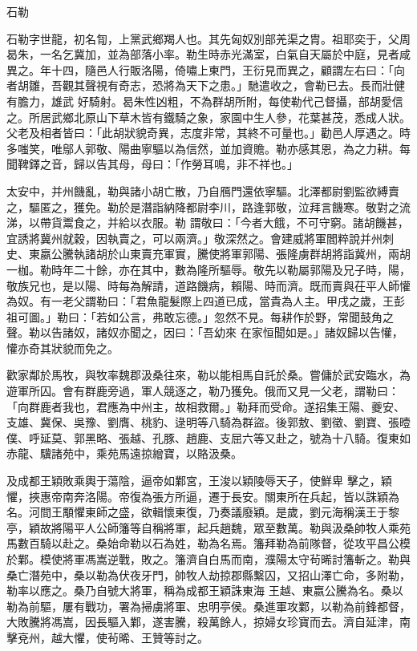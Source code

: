 
\begin{pinyinscope}
石勒



 石勒字世龍，初名㔨，上黨武鄉羯人也。其先匈奴別部羌渠之胄。祖耶奕于，父周曷朱，一名乞冀加，並為部落小率。勒生時赤光滿室，白氣自天屬於中庭，見者咸異之。年十四，隨邑人行販洛陽，倚嘯上東門，王衍見而異之，顧謂左右曰：「向者胡雛，吾觀其聲視有奇志，恐將為天下之患。」馳遣收之，會勒已去。長而壯健有膽力，雄武
 好騎射。曷朱性凶粗，不為群胡所附，每使勒代己督攝，部胡愛信之。所居武鄉北原山下草木皆有鐵騎之象，家園中生人參，花葉甚茂，悉成人狀。父老及相者皆曰：「此胡狀貌奇異，志度非常，其終不可量也。」勸邑人厚遇之。時多嗤笑，唯鄔人郭敬、陽曲寧驅以為信然，並加資贍。勒亦感其恩，為之力耕。每聞鞞鐸之音，歸以告其母，母曰：「作勞耳鳴，非不祥也。」



 太安中，并州饑亂，勒與諸小胡亡散，乃自鴈門還依寧驅。北澤都尉劉監欲縛賣之，驅匿之，獲免。勒於是潛詣納降都尉李川，路逢郭敬，泣拜言饑寒。敬對之流涕，以帶貨鬻食之，并給以衣服。勒
 謂敬曰：「今者大餓，不可守窮。諸胡饑甚，宜誘將冀州就穀，因執賣之，可以兩濟。」敬深然之。會建威將軍閻粹說并州刺史、東嬴公騰執諸胡於山東賣充軍實，騰使將軍郭陽、張隆虜群胡將詣冀州，兩胡一枷。勒時年二十餘，亦在其中，數為隆所驅辱。敬先以勒屬郭陽及兄子時，陽，敬族兄也，是以陽、時每為解請，道路饑病，賴陽、時而濟。既而賣與茌平人師懽為奴。有一老父謂勒曰：「君魚龍髮際上四道已成，當貴為人主。甲戌之歲，王彭祖可圖。」勒曰：「若如公言，弗敢忘德。」忽然不見。每耕作於野，常聞鼓角之聲。勒以告諸奴，諸奴亦聞之，因曰：「吾幼來
 在家恒聞如是。」諸奴歸以告懽，懽亦奇其狀貌而免之。



 歡家鄰於馬牧，與牧率魏郡汲桑往來，勒以能相馬自託於桑。嘗傭於武安臨水，為遊軍所囚。會有群鹿旁過，軍人競逐之，勒乃獲免。俄而又見一父老，謂勒曰：「向群鹿者我也，君應為中州主，故相救爾。」勒拜而受命。遂招集王陽、夔安、支雄、冀保、吳豫、劉膺、桃豹、逯明等八騎為群盜。後郭敖、劉徵、劉寶、張曀僕、呼延莫、郭黑略、張越、孔豚、趙鹿、支屈六等又赴之，號為十八騎。復東如赤龍、驥諸苑中，乘苑馬遠掠繒寶，以賂汲桑。



 及成都王穎敗乘輿于蕩陰，逼帝如鄴宮，王浚以穎陵辱天子，使鮮卑
 擊之，穎懼，挾惠帝南奔洛陽。帝復為張方所逼，遷于長安。關東所在兵起，皆以誅穎為名。河間王顒懼東師之盛，欲輯懷東復，乃奏議廢穎。是歲，劉元海稱漢王于黎亭，穎故將陽平人公師籓等自稱將軍，起兵趙魏，眾至數萬。勒與汲桑帥牧人乘苑馬數百騎以赴之。桑始命勒以石為姓，勒為名焉。籓拜勒為前隊督，從攻平昌公模於鄴。模使將軍馮嵩逆戰，敗之。籓濟自白馬而南，濮陽太守茍晞討籓斬之。勒與桑亡潛苑中，桑以勒為伏夜牙門，帥牧人劫掠郡縣繫囚，又招山澤亡命，多附勒，勒率以應之。桑乃自號大將軍，稱為成都王穎誅東海
 王越、東嬴公騰為名。桑以勒為前驅，屢有戰功，署為掃虜將軍、忠明亭侯。桑進軍攻鄴，以勒為前鋒都督，大敗騰將馮嵩，因長驅入鄴，遂害騰，殺萬餘人，掠婦女珍寶而去。濟自延津，南擊兗州，越大懼，使茍晞、王贊等討之。




\end{pinyinscope}
